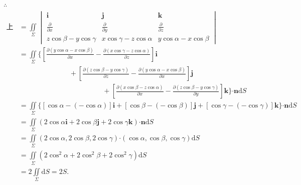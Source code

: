 \documentclass[12pt,UTF8,fleqn]{ctexart}
\newcommand{\md}[1]{\mathrm d#1}
\newcommand{\BSIInt}[2]{\iint\limits_{#1}#2}
\newcommand{\pp}[2]{\frac{\partial #1}{\partial #2}}
\begin{document}
\begin{enumerate}
$\therefore$
\[\begin{aligned}
\text{上式}&=\BSIInt\Sigma{\begin{vmatrix}
\bm i&\bm j&\bm k\\
\frac\partial{\partial x}&\frac\partial{\partial y}&\frac\partial{\partial z}\\
z\cos\beta-y\cos\gamma&x\cos\gamma-z\cos\alpha&y\cos\alpha-x\cos\beta
\end{vmatrix}}\\
&=\BSIInt\Sigma{\{[\pp{(y\cos\alpha-x\cos\beta)}x-\pp{(x\cos\gamma-z\cos\alpha)}z]\bm i\\
&\hspace{3cm}+[\pp{(z\cos\beta-y\cos\gamma)}z-\pp{(y\cos\alpha-x\cos\beta)}x]\bm j\\
&\hspace{5cm}+[\pp{(x\cos\beta-z\cos\alpha)}x-\pp{(z\cos\beta-y\cos\gamma)}y]\bm k\}\bm\cdot\bm n\md S}\\
&=\BSIInt\Sigma{\{[\cos\alpha-(-\cos\alpha)]\bm i+[\cos\beta-(-\cos\beta)]\bm j+[\cos\gamma-(-\cos\gamma)]\bm k\}\bm\cdot\bm n\md S}\\
&=\BSIInt\Sigma{(2\cos\alpha\bm i+2\cos\beta\bm j+2\cos\gamma\bm k)\bm\cdot\bm n\md S}\\
&=\BSIInt\Sigma{(2\cos\alpha,2\cos\beta,2\cos\gamma)\bm\cdot(\cos\alpha,\cos\beta,\cos\gamma)\md S}\\
&=\BSIInt\Sigma{(2\cos^2\alpha+2\cos^2\beta+2\cos^2\gamma)\md S}\\
&=2\BSIInt\Sigma{\md S}=2S.
\end{aligned}\]
\end{enumerate}
\end{document}

